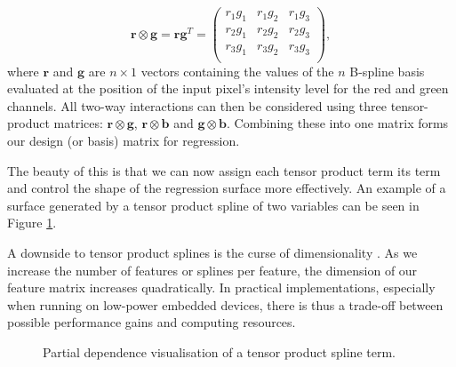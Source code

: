 \begin{equation}
\label{tensorspline}
\mathbf{r} \otimes \mathbf{g} = \mathbf{r} \mathbf{g}^T =
\begin{pmatrix}
r_1 g_1 & r_1 g_2 & r_1 g_3 \\
r_2 g_1 & r_2 g_2 & r_2 g_3 \\
r_3 g_1 & r_3 g_2 & r_3 g_3 \\
\end{pmatrix},
\end{equation}
where $\mathbf{r}$ and $\mathbf{g}$ are $n \times 1$ vectors containing the values of the $n$ B-spline basis evaluated at the position of the input pixel's intensity level for the red and green channels. All two-way interactions can then be considered using three tensor-product matrices: $\mathbf{r} \otimes \mathbf{g}$, $\mathbf{r} \otimes \mathbf{b}$ and $\mathbf{g} \otimes \mathbf{b}$. Combining these into one matrix forms our design (or basis) matrix for regression.

The beauty of this is that we can now assign each tensor product term its term and control the shape of the regression surface more effectively. An example of a surface generated by a tensor product spline of two variables can be seen in Figure \ref{fig:tensorspline}.

A downside to tensor product splines is the curse of dimensionality \cite[163]{HastieTrevor2009EoSL}. As we increase the number of features or splines per feature, the dimension of our feature matrix increases quadratically. In practical implementations, especially when running on low-power embedded devices, there is thus a trade-off between possible performance gains and computing resources. 

\begin{figure}
    \centering
    \caption{Partial dependence visualisation of a tensor product spline term.}
    \label{fig:tensorspline}
\end{figure}

